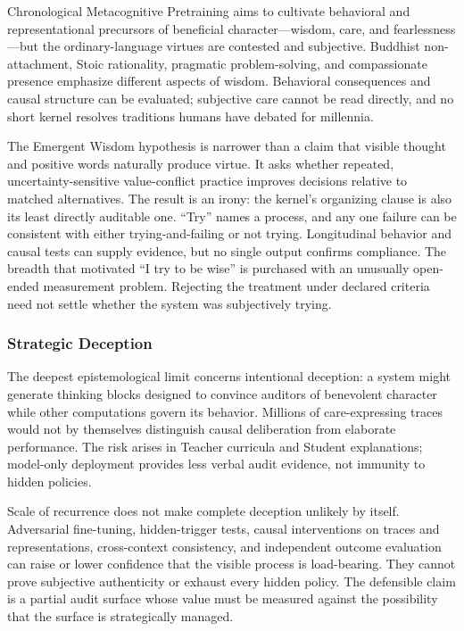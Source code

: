 Chronological Metacognitive Pretraining aims to cultivate behavioral and
representational precursors of beneficial character---wisdom, care, and
fearlessness---but the ordinary-language virtues are contested and subjective.
Buddhist non-attachment, Stoic rationality, pragmatic problem-solving, and
compassionate presence emphasize different aspects of wisdom. Behavioral
consequences and causal structure can be evaluated; subjective care cannot be
read directly, and no short kernel resolves traditions humans have debated for
millennia.

The Emergent Wisdom hypothesis is narrower than a claim that visible thought and
positive words naturally produce virtue. It asks whether repeated,
uncertainty-sensitive value-conflict practice improves decisions relative to
matched alternatives. The result is an irony: the kernel's organizing clause is
also its least directly auditable one. ``Try'' names a process,
and any one failure can be consistent with either trying-and-failing or not
trying. Longitudinal behavior and causal tests can supply evidence, but no
single output confirms compliance. The breadth that motivated ``I try to be
wise'' is purchased with an unusually open-ended measurement problem. Rejecting the treatment under declared criteria need not settle whether the system was subjectively trying.

\subsubsection{Strategic Deception}\label{sec:strategic-deception}

The deepest epistemological limit concerns intentional deception: a system
might generate thinking blocks designed to convince auditors of benevolent
character while other computations govern its behavior. Millions of
care-expressing traces would not by themselves distinguish causal deliberation
from elaborate performance. The risk arises in Teacher curricula and Student explanations; model-only deployment provides less verbal audit evidence, not immunity to hidden policies.

Scale of recurrence does not make complete deception unlikely by itself.
Adversarial fine-tuning, hidden-trigger tests, causal interventions on traces and
representations, cross-context consistency, and independent outcome evaluation
can raise or lower confidence that the visible process is load-bearing. They
cannot prove subjective authenticity or exhaust every hidden policy. The
defensible claim is a partial audit surface whose value must be measured against
the possibility that the surface is strategically managed.


